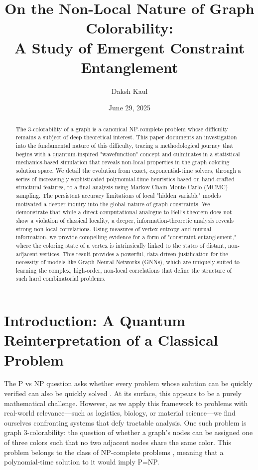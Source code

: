 \documentclass[12pt, letterpaper]{article}
\title{On the Non-Local Nature of Graph Colorability:\\A Study of Emergent Constraint Entanglement}
\author{Daksh Kaul}
\date{June 29, 2025}
\begin{document}
\maketitle

\begin{abstract}
The 3-colorability of a graph is a canonical NP-complete problem whose difficulty remains a subject of deep theoretical interest. This paper documents an investigation into the fundamental nature of this difficulty, tracing a methodological journey that begins with a quantum-inspired "wavefunction" concept and culminates in a statistical mechanics-based simulation that reveals non-local properties in the graph coloring solution space. We detail the evolution from exact, exponential-time solvers, through a series of increasingly sophisticated polynomial-time heuristics based on hand-crafted structural features, to a final analysis using Markov Chain Monte Carlo (MCMC) sampling. The persistent accuracy limitations of local "hidden variable" models motivated a deeper inquiry into the global nature of graph constraints. We demonstrate that while a direct computational analogue to Bell's theorem does not show a violation of classical locality, a deeper, information-theoretic analysis reveals strong non-local correlations. Using measures of vertex entropy and mutual information, we provide compelling evidence for a form of "constraint entanglement," where the coloring state of a vertex is intrinsically linked to the states of distant, non-adjacent vertices. This result provides a powerful, data-driven justification for the necessity of models like Graph Neural Networks (GNNs), which are uniquely suited to learning the complex, high-order, non-local correlations that define the structure of such hard combinatorial problems.
\end{abstract}

\section{Introduction: A Quantum Reinterpretation of a Classical Problem}

The P vs NP question asks whether every problem whose solution can be quickly verified can also be quickly solved \cite{cook1971complexity}. At its surface, this appears to be a purely mathematical challenge. However, as we apply this framework to problems with real-world relevance---such as logistics, biology, or material science---we find ourselves confronting systems that defy tractable analysis. One such problem is graph 3-colorability: the question of whether a graph's nodes can be assigned one of three colors such that no two adjacent nodes share the same color. This problem belongs to the class of NP-complete problems \cite{karp1972reducibility}, meaning that a polynomial-time solution to it would imply P=NP.
\end{document}
